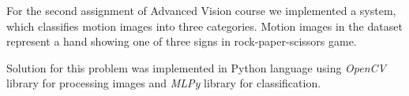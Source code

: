 For the second assignment of Advanced Vision course we implemented a system, which classifies motion images into three categories. Motion images in the dataset represent a hand showing one of three signs in rock-paper-scissors game. 

Solution for this problem was implemented in Python language using \textit{OpenCV} library for processing images and \textit{MLPy} library for classification.